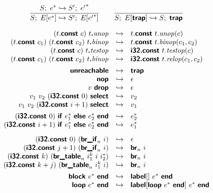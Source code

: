 \documentclass[a4paper]{scrartcl}
\newcommand\void[1]{}
\newcommand\x[1]{\ensuremath{\mathit{#1}}\xspace}
\newcommand\evalto{\hookrightarrow}
\newcommand\K[1]{\ensuremath{\textsf{#1}}}
\newcommand\KK[1]{\ensuremath{\K{\textbf{#1}}}}
\begin{document}
$$
\frac{
  S;~e^\ast \evalto S';~{e'}^\ast
}{
  S;~E[e^\ast] \evalto S';~E[{e'}^\ast]
}
\qquad
\frac{
}{
  S;~E[\KK{trap}] \evalto S;~\KK{trap}
}
$$


$$
\begin{array}{rcl}
(t.\KK{const}~c)~t\KK{.}\x{unop} &\evalto&
  t.\KK{const}~t.\x{unop}(c) \\
(t.\KK{const}~c_1)~(t.\KK{const}~c_2)~t\KK{.}\x{binop} &\evalto&
  t.\KK{const}~t.\x{binop}(c_1, c_2) \\
(t.\KK{const}~c)~t\KK{.}\x{testop} &\evalto&
  \KK{i32.const}~t.\x{testop}(c) \\
(t.\KK{const}~c_1)~(t.\KK{const}~c_2)~t\KK{.}\x{binop} &\evalto&
  \KK{i32.const}~t.\x{relop}(c_1, c_2) \\
[1ex]
\KK{unreachable} &\evalto&
  \KK{trap} \\
\KK{nop} &\evalto&
  \epsilon \\
v~\KK{drop} &\evalto&
  \epsilon \\
v_1~v_2~(\KK{i32.const}~0)~\KK{select} &\evalto&
  v_2 \\
v_1~v_2~(\KK{i32.const}~i+1)~\KK{select} &\evalto&
  v_1 \\
[1ex]
\void{
\KK{block}~v^\ast~\KK{end} &\evalto&
  v^\ast \\
\KK{block}~v^\ast~v^n~(\KK{br}_n~0)~e^\ast~\KK{end} &\evalto&
  v^n \\
\KK{block}~v^\ast~v^n~(\KK{br}_n~i+1)~e^\ast~\KK{end} &\evalto&
 v^n~(\KK{br}_n~i) \\
[1ex]
\KK{loop}~e^\ast~\KK{end} &\evalto&
  \KK{block}~e^\ast~\KK{end}~\KK{loop}~e^\ast~\KK{end} \\
[1ex]
}
(\KK{i32.const}~0)~\KK{if}~e_1^\ast~\KK{else}~e_2^\ast~\KK{end} &\evalto&
  e_2^\ast \\
(\KK{i32.const}~i+1)~\KK{if}~e_1^\ast~\KK{else}~e_2^\ast~\KK{end} &\evalto&
  e_1^\ast \\
[2ex]
(\KK{i32.const}~0)~(\KK{br\_if}_n~i) &\evalto&
  \epsilon \\
(\KK{i32.const}~j+1)~(\KK{br\_if}_n~i) &\evalto&
  \KK{br}_n~i \\
(\KK{i32.const}~k)~(\KK{br\_table}_n~i_1^k~i~i_2^\ast) &\evalto&
  \KK{br}_n~i \\
(\KK{i32.const}~k+j)~(\KK{br\_table}_n~i_1^k~i) &\evalto&
  \KK{br}_n~i \\
[1ex]
\KK{block}~e^\ast~\KK{end} &\evalto&
  \KK{label}[]~e^\ast~\KK{end} \\
\KK{loop}~e^\ast~\KK{end} &\evalto&
  \KK{label}[\KK{loop}~e^\ast~\KK{end}]~e^\ast~\KK{end} \\

\end{array}$$
\end{document}
